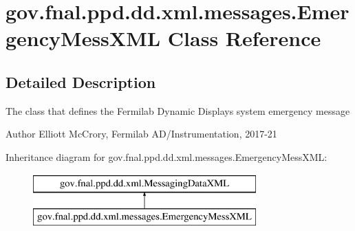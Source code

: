\hypertarget{classgov_1_1fnal_1_1ppd_1_1dd_1_1xml_1_1messages_1_1EmergencyMessXML}{\section{gov.\-fnal.\-ppd.\-dd.\-xml.\-messages.\-Emergency\-Mess\-X\-M\-L Class Reference}
\label{classgov_1_1fnal_1_1ppd_1_1dd_1_1xml_1_1messages_1_1EmergencyMessXML}
}


\subsection{Detailed Description}
The class that defines the Fermilab Dynamic Displays system emergency message

\begin{DoxyAuthor}{Author}
Elliott Mc\-Crory, Fermilab A\-D/\-Instrumentation, 2017-\/21 
\end{DoxyAuthor}
Inheritance diagram for gov.\-fnal.\-ppd.\-dd.\-xml.\-messages.\-Emergency\-Mess\-X\-M\-L\-:\begin{figure}[H]
\begin{center}
\leavevmode
\includegraphics[height=2.000000cm]{classgov_1_1fnal_1_1ppd_1_1dd_1_1xml_1_1messages_1_1EmergencyMessXML}
\end{center}
\end{figure}
